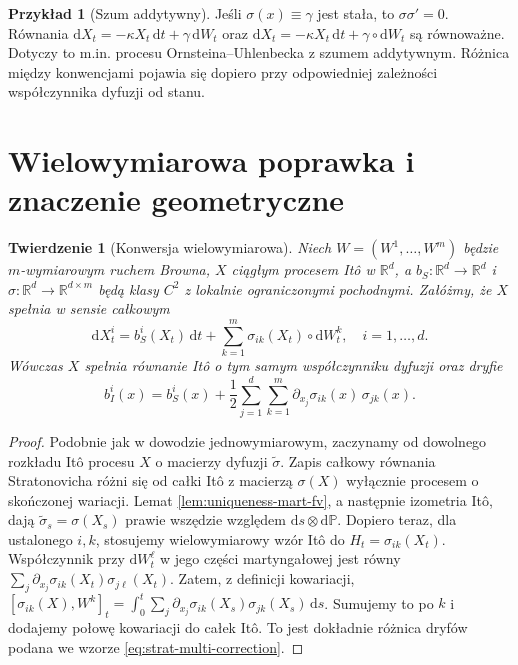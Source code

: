 \documentclass[11pt,a4paper,oneside]{report}
\numberwithin{equation}{chapter}
\theoremstyle{plain}
\newtheorem{twierdzenie}{Twierdzenie}[chapter]
\theoremstyle{definition}
\newtheorem{przyklad}{Przykład}[chapter]
\theoremstyle{remark}
\newcommand{\R}{\mathbb{R}}
\newcommand{\Prob}{\mathbb{P}}
\newcommand{\dd}{\mathrm{d}}
\begin{document}
\begin{przyklad}[Szum addytywny]
Jeśli $\sigma(x)\equiv\gamma$ jest stała, to
$\sigma\sigma'=0$. Równania
$\dd X_t=-\kappa X_t\,\dd t+\gamma\,\dd W_t$
oraz
$\dd X_t=-\kappa X_t\,\dd t+\gamma\circ\dd W_t$
są równoważne. Dotyczy to m.in. procesu
Ornsteina--Uhlenbecka z szumem addytywnym.
Różnica między konwencjami pojawia się dopiero przy
odpowiedniej zależności współczynnika dyfuzji od stanu.
\end{przyklad}

\section{Wielowymiarowa poprawka i znaczenie geometryczne}
\begin{twierdzenie}[Konwersja wielowymiarowa]
Niech $W=(W^1,\ldots,W^m)$ będzie $m$-wymiarowym
ruchem Browna, $X$ ciągłym procesem Itô w $\R^d$,
a $b_S:\R^d\to\R^d$ i
$\sigma:\R^d\to\R^{d\times m}$ będą klasy $C^2$
z lokalnie ograniczonymi pochodnymi.
Załóżmy, że $X$ spełnia w sensie całkowym
\[
\dd X_t^i=b_S^i(X_t)\,\dd t
+\sum_{k=1}^m\sigma_{ik}(X_t)\circ\dd W_t^k,
\quad i=1,\ldots,d.
\]
Wówczas $X$ spełnia równanie Itô o tym samym
współczynniku dyfuzji oraz dryfie
\[
b_I^i(x)=b_S^i(x)+\frac12\sum_{j=1}^d
\sum_{k=1}^m\partial_{x_j}\sigma_{ik}(x)\,
\sigma_{jk}(x).
\tag{4.10}\label{eq:strat-multi-correction}
\]
\end{twierdzenie}
\begin{proof}
Podobnie jak w dowodzie jednowymiarowym, zaczynamy
od dowolnego rozkładu Itô procesu $X$ o macierzy
dyfuzji $\widetilde\sigma$. Zapis całkowy równania
Stratonovicha różni się od całki Itô z macierzą
$\sigma(X)$ wyłącznie procesem o skończonej wariacji.
Lemat \ref{lem:uniqueness-mart-fv}, a następnie izometria
Itô, dają $\widetilde\sigma_s=\sigma(X_s)$ prawie
wszędzie względem $\dd s\otimes\dd\Prob$.
Dopiero teraz, dla ustalonego $i,k$, stosujemy
wielowymiarowy wzór Itô do $H_t=\sigma_{ik}(X_t)$.
Współczynnik przy $\dd W_t^\ell$ w jego części
martyngałowej jest równy
$\sum_j\partial_{x_j}\sigma_{ik}(X_t)\sigma_{j\ell}(X_t)$.
Zatem, z definicji kowariacji,
$[\sigma_{ik}(X),W^k]_t=
\int_0^t\sum_j\partial_{x_j}\sigma_{ik}(X_s)
\sigma_{jk}(X_s)\,\dd s$.
Sumujemy to po $k$ i dodajemy połowę kowariacji do
całek Itô. To jest dokładnie różnica dryfów podana
we wzorze \eqref{eq:strat-multi-correction}.
\end{proof}
\end{document}
